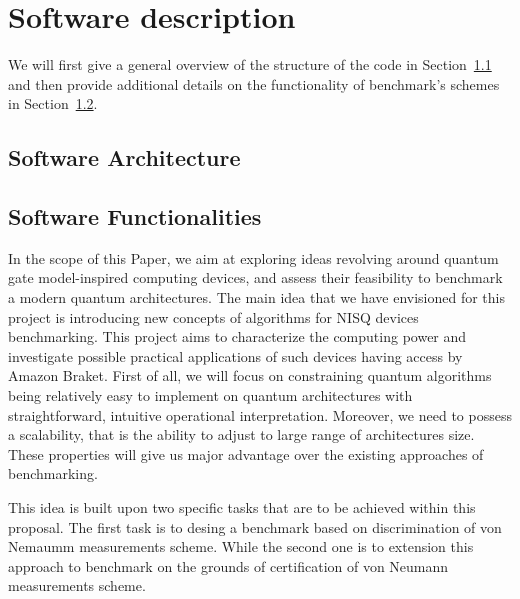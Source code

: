 \documentclass[preprint,12pt, a4paper]{elsarticle}
\newcommand{\1}{{\rm 1\hspace{-0.9mm}l}}
\begin{document}
\section{Software description}
\label{}

We will first give a general overview of the structure of the code in 
Section~\ref{sec:sortware-architecture} and then provide additional details on 
the functionality of benchmark's schemes  in 
Section~\ref{sec:sortware-functionalities}.

\subsection{Software Architecture}\label{sec:sortware-architecture}
\label{}


\subsection{Software Functionalities}\label{sec:sortware-functionalities}

In the scope of this Paper, we aim at  exploring ideas revolving around quantum 
gate model-inspired computing devices, and assess their feasibility to 
benchmark a modern quantum architectures. The main idea that we have envisioned 
for this project is  introducing new concepts of algorithms for NISQ devices 
benchmarking. This project aims to characterize the computing power and 
investigate possible practical applications of such devices having access by 
Amazon Braket.  First of all, we will focus on constraining quantum algorithms 
being relatively easy to implement on quantum architectures with 
straightforward, intuitive operational interpretation. Moreover, we need to 
possess a scalability, that is the ability to adjust to large range of 
architectures size.  
These properties will give us major advantage over the existing approaches  of 
benchmarking. 


This idea is built upon two specific tasks that are to be achieved within this 
proposal. 
The first task is to   desing a benchmark based on discrimination of von 
Nemaumm measurements scheme. While the second one is to extension  this 
approach to benchmark on the grounds of certification of von Neumann 
measurements scheme.
\end{document}
